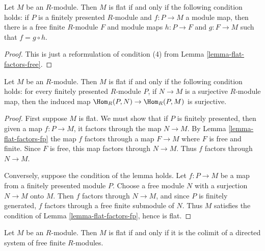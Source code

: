 \begin{lemma}
\label{lemma-flat-factors-fp}
Let $M$ be an $R$-module.  Then $M$ is flat if and only if the following
condition holds: if $P$ is a finitely presented $R$-module and $f: P
\to M$ a module map, then there is a free finite $R$-module $F$ and
module maps $h: P \to F$ and $g: F \to M$ such that $f = g
\circ h$.
\end{lemma}

\begin{proof}
This is just a reformulation of condition (4) from
Lemma \ref{lemma-flat-factors-free}.
\end{proof}

\begin{lemma}
\label{lemma-flat-surjective-hom}
Let $M$ be an $R$-module.  Then $M$ is flat if and only if the following
condition holds: for every finitely presented $R$-module $P$, if $N \to
M$ is a surjective $R$-module map, then the induced map $\Hom_R(P, N)
\to \Hom_R(P, M)$ is surjective.
\end{lemma}

\begin{proof}
First suppose $M$ is flat.  We must show that if $P$ is finitely presented,
then given a map $f: P \to M$, it factors through the map $N
\to M$.  By
Lemma \ref{lemma-flat-factors-fp}
the map $f$ factors through a map $F \to M$ where $F$ is free and finite.
Since $F$ is free, this map factors through
$N \to M$.  Thus $f$ factors through $N \to M$.

\medskip\noindent
Conversely, suppose the condition of the lemma holds.  Let $f: P \to M$
be a map from a finitely presented module $P$.  Choose a free module $N$ with a
surjection $N \to M$ onto $M$.  Then $f$ factors through $N \to
M$, and since $P$ is finitely generated, $f$ factors through a free finite
submodule of $N$.  Thus $M$ satisfies the condition of Lemma
\ref{lemma-flat-factors-fp}, hence is flat.
\end{proof}

\begin{theorem}
\label{theorem-lazard}
Let $M$ be an $R$-module.  Then $M$ is flat if and only if it is the colimit of
a directed system of free finite $R$-modules.
\end{theorem}

